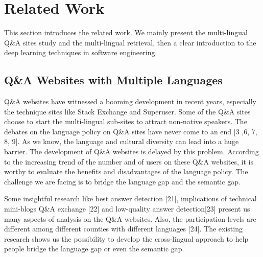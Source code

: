 
\chapter{Related Work}
This section introduces the related work. We mainly present the multi-lingual Q\&A sites study and the multi-lingual retrieval, then a clear introduction to the deep learning techniques in software engineering.

\section{Q\&A Websites with Multiple Languages}
Q\&A websites have witnessed a booming development in recent years, especially the technique sites like Stack Exchange and Superuser. Some of the Q\&A sites choose to start the multi-lingual sub-sites to attract non-native speakers. The debates on the language policy on Q\&A sites have never come to an end [3 ,6, 7, 8, 9]. As we know, the language and cultural diversity can lead into a huge barrier. The development of Q\&A websites is delayed by this problem. According to the increasing trend of the number and of users on these Q\&A websites, it is worthy to evaluate the benefits and disadvantages of the language policy. The challenge we are facing is to bridge the language gap and the semantic gap. 
\par
Some insightful research like best answer detection [21], implications of technical mini-blogs Q\&A exchange [22] and low-quality answer detection[23] present us many aspects of analysis on the Q\&A websites. Also, the participation levels are different among different counties with different languages [24]. The existing research shows us the possibility to develop the cross-lingual approach to help people bridge the language gap or even the semantic gap. 
\par


